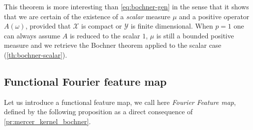 This theorem is more interesting than \cref{eq:bochner-gen} in the sense that it shows that we are certain of the existence of a \emph{scalar} measure $\mu$ and a positive operator $A(\omega)$, provided that $\mathcal{X}$ is compact or $\mathcal{Y}$ is finite dimensional. When $p=1$ one can always assume $A$ is reduced to the scalar $1$, $\mu$ is still a bounded positive measure and we retrieve the Bochner theorem applied to the scalar case (\cref{th:bochner-scalar}).

\subsection{Functional Fourier feature map}
Let us introduce a functional feature map, we call here \emph{Fourier Feature map}, defined by the following proposition as a direct consequence of \cref{pr:mercer_kernel_bochner}.

